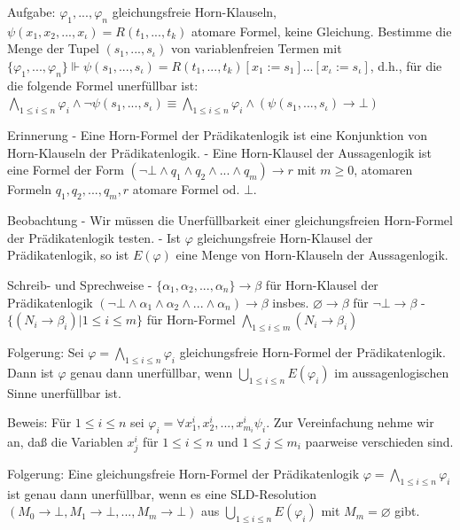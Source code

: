 \documentclass[a4paper]{article}
\begin{document}
\begin{multicols}{3}
  Aufgabe: $\varphi_1,...,\varphi_n$ gleichungsfreie Horn-Klauseln,
  $\psi(x_1,x_2,...,x_{\iota} )=R(t_1,...,t_k)$ atomare Formel, keine
  Gleichung. Bestimme die Menge der Tupel $(s_1,...,s_{\iota} )$ von
  variablenfreien Termen mit
  $\{\varphi_1,...,\varphi_n\}\Vdash\psi(s_1,...,s_{\iota} )=R(t_1,...,t_k)[x_1:=s_1]...[x_{\iota} :=s_{\iota} ]$,
  d.h., für die die folgende Formel unerfüllbar ist:
  $\bigwedge_{1\leq i\leq n} \varphi_i \wedge \lnot\psi(s_1,...,s_{\iota} ) \equiv \bigwedge_{1\leq i\leq n} \varphi_i\wedge(\psi(s_1,...,s_{\iota} )\rightarrow\bot)$

  Erinnerung - Eine Horn-Formel der Prädikatenlogik ist eine Konjunktion
  von Horn-Klauseln der Prädikatenlogik. - Eine Horn-Klausel der
  Aussagenlogik ist eine Formel der Form
  $(\lnot\bot\wedge q_1\wedge q_2 \wedge...\wedge q_m)\rightarrow r$ mit
  $m\geq 0$, atomaren Formeln $q_1,q_2,...,q_m, r$ atomare Formel od.
  $\bot$.

  Beobachtung - Wir müssen die Unerfüllbarkeit einer gleichungsfreien
  Horn-Formel der Prädikatenlogik testen. - Ist $\varphi$ gleichungsfreie
  Horn-Klausel der Prädikatenlogik, so ist $E(\varphi)$ eine Menge von
  Horn-Klauseln der Aussagenlogik.

  Schreib- und Sprechweise -
  $\{\alpha_1,\alpha_2,...,\alpha_n\}\rightarrow\beta$ für Horn-Klausel
  der Prädikatenlogik
  $(\lnot\bot\wedge\alpha_1 \wedge\alpha_2\wedge...\wedge\alpha_n)\rightarrow\beta$
  insbes. $\varnothing\rightarrow\beta$ für $\lnot\bot\rightarrow\beta$ -
  $\{(N_i\rightarrow\beta_i) | 1\leq i\leq m\}$ für Horn-Formel
  $\bigwedge_{1\leq i\leq m} (N_i\rightarrow\beta_i)$

  Folgerung: Sei $\varphi =\bigwedge_{1\leq i\leq n} \varphi_i$
  gleichungsfreie Horn-Formel der Prädikatenlogik. Dann ist $\varphi$
  genau dann unerfüllbar, wenn $\bigcup_{1\leq i\leq n} E(\varphi_i)$ im
  aussagenlogischen Sinne unerfüllbar ist.

  Beweis: Für $1\leq i\leq n$ sei
  $\varphi_i=\forall x_1^i,x_2^i,...,x_{m_i}^i \psi_i$. Zur Vereinfachung
  nehme wir an, daß die Variablen $x_j^i$ für $1\leq i\leq n$ und
  $1\leq j\leq m_i$ paarweise verschieden sind.

  Folgerung: Eine gleichungsfreie Horn-Formel der Prädikatenlogik
  $\varphi=\bigwedge_{1\leq i\leq n} \varphi_i$ ist genau dann
  unerfüllbar, wenn es eine SLD-Resolution
  $(M_0\rightarrow\bot,M_1\rightarrow\bot,...,M_m\rightarrow\bot)$ aus
  $\bigcup_{1\leq i\leq n} E(\varphi_i)$ mit $M_m =\varnothing$ gibt.


\end{multicols}
\end{document}
